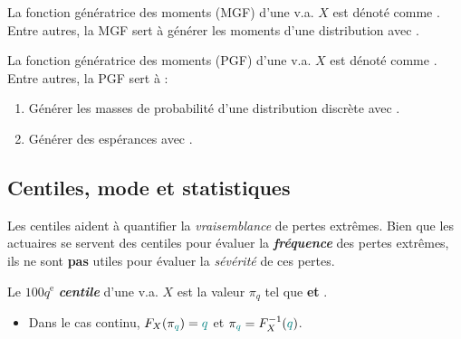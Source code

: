\documentclass[10pt, french]{article}
\begin{document}
\begin{multicols*}{2}
\begin{definitionNOHFILL}
La fonction génératrice des moments (MGF) d'une v.a. $X$ est dénoté comme .\\

Entre autres, la MGF sert à générer les moments d'une distribution avec .
\end{definitionNOHFILL}

\begin{definitionNOHFILL}
La fonction génératrice des moments (PGF) d'une v.a. $X$ est dénoté comme .\\

Entre autres, la PGF sert à :  
\begin{enumerate}
	\item	Générer les masses de probabilité d'une distribution discrète avec .
	\item	Générer des espérances avec .
\end{enumerate}
\end{definitionNOHFILL}


\columnbreak
\subsection{Centiles, mode et statistiques}
\begin{definitionNOHFILL}[Centile]
\begin{rappel_enhanced}[Contexte]
Les centiles aident à quantifier la \textit{vraisemblance} de pertes extrêmes. Bien que les actuaires se servent des centiles pour évaluer la \textit{\textbf{fréquence}} des pertes extrêmes, ils ne sont \textbf{pas} utiles pour évaluer la \textit{sévérité} de ces pertes.
\end{rappel_enhanced}

Le $100q^{\text{e}}$ \textbf{\textit{centile}} d'une v.a. $X$ est la valeur $\pi_{q}$ tel que  \textbf{et} .\\

\begin{itemize}
	\item	Dans le cas continu, $F_{X}(\pi_{\textcolor{teal}{q}})	=	\textcolor{teal}{q}$ et $\pi_{\textcolor{teal}{q}}	=	F^{-1}_{X}(\textcolor{teal}{q})$.
\end{itemize}
\end{definitionNOHFILL}


\end{multicols*}
\end{document}
